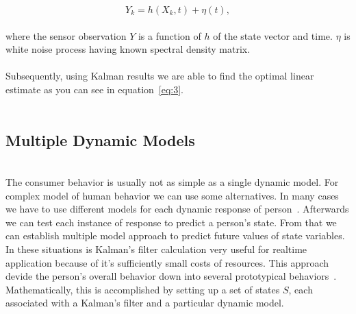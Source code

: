 \begin{equation} \label{eq:2}
Y_k = h(X_k, t) + \eta(t),
\end{equation}
\\
where the sensor observation $Y$ is a function of $h$ of the state vector and time. $\eta$ is white noise process having known spectral density matrix.\\
\\
Subsequently, using Kalman results we are able to find the optimal linear estimate as you can see in equation~\ref{eq:3}.\\
\\
\subsection{Multiple Dynamic Models} \label{subsec:multipleDynamicModels}\\
The consumer behavior is usually not as simple as a single dynamic model.
For complex model of human behavior we can use some alternatives.
In many cases we have to use different models for each dynamic response of person~\cite{wilsky}.
Afterwards we can test each instance of response to predict a person's state.
From that we can establish multiple model approach to predict future values of state variables.
In these situations is Kalman’s filter calculation very useful for realtime application because of it’s sufficiently small costs of resources.
This approach devide the person’s overall behavior down into several prototypical behaviors~\cite{pantland}.
Mathematically, this is accomplished by setting up a set of states $S$, each associated with a Kalman’s filter and a particular dynamic model.\\
\\

